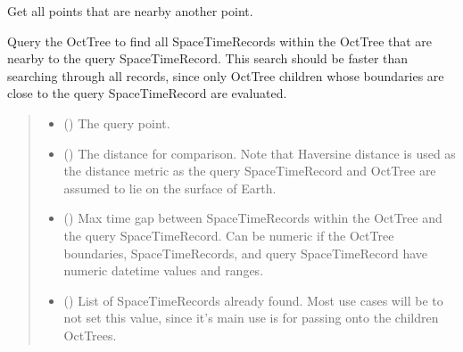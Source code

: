 \documentclass[letterpaper,10pt,english]{sphinxmanual}
\begin{document}
\begin{fulllineitems}
\begin{fulllineitems}
\end{fulllineitems}


\begin{fulllineitems}
\label{\detokenize{users_guide:GeoSpatialTools.octtree.OctTree.nearby_points}}
\pysigstartsignatures
{}
\pysigstopsignatures
\sphinxAtStartPar
Get all points that are nearby another point.

\sphinxAtStartPar
Query the OctTree to find all SpaceTimeRecords within the OctTree that
are nearby to the query SpaceTimeRecord. This search should be faster
than searching through all records, since only OctTree children whose
boundaries are close to the query SpaceTimeRecord are evaluated.
\begin{quote}\begin{description}
\begin{itemize}
\item {} 
\sphinxAtStartPar
{} ({\hyperref[\detokenize{users_guide:GeoSpatialTools.octtree.SpaceTimeRecord}]{}}) \textendash{} The query point.

\item {} 
\sphinxAtStartPar
{} () \textendash{} The distance for comparison. Note that Haversine distance is used
as the distance metric as the query SpaceTimeRecord and OctTree are
assumed to lie on the surface of Earth.

\item {} 
\sphinxAtStartPar
{} () \textendash{} Max time gap between SpaceTimeRecords within the OctTree and the
query SpaceTimeRecord. Can be numeric if the OctTree boundaries,
SpaceTimeRecords, and query SpaceTimeRecord have numeric datetime
values and ranges.

\item {} 
\sphinxAtStartPar
{} ({\hyperref[\detokenize{users_guide:GeoSpatialTools.octtree.SpaceTimeRecords}]{}}\sphinxstyleliteralemphasis{\sphinxupquote{ | }}) \textendash{} List of SpaceTimeRecords already found. Most use cases will be to
not set this value, since it’s main use is for passing onto the
children OctTrees.


\end{itemize}
\end{description}
\end{quote}
\end{fulllineitems}
\end{fulllineitems}
\end{document}
